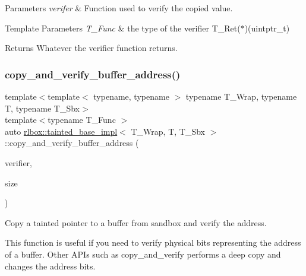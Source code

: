 \begin{DoxyParams}{Parameters}
{\em verifer} & Function used to verify the copied value. \\
\hline
\end{DoxyParams}

\begin{DoxyTemplParams}{Template Parameters}
{\em T\+\_\+\+Func} & the type of the verifier {\ttfamily T\+\_\+\+Ret($\ast$)(uintptr\+\_\+t)} \\
\hline
\end{DoxyTemplParams}
\begin{DoxyReturn}{Returns}
Whatever the verifier function returns. 
\end{DoxyReturn}
\mbox{\label{classrlbox_1_1tainted__base__impl_a4f739a0994af23036cce2d06b10953ee}} 
\subsubsection{\texorpdfstring{copy\+\_\+and\+\_\+verify\+\_\+buffer\+\_\+address()}{copy\_and\_verify\_buffer\_address()}}
{\footnotesize\ttfamily template$<$template$<$ typename, typename $>$ typename T\+\_\+\+Wrap, typename T, typename T\+\_\+\+Sbx$>$ \\
template$<$typename T\+\_\+\+Func $>$ \\
auto \hyperlink{classrlbox_1_1tainted__base__impl}{rlbox\+::tainted\+\_\+base\+\_\+impl}$<$ T\+\_\+\+Wrap, T, T\+\_\+\+Sbx $>$\+::copy\+\_\+and\+\_\+verify\+\_\+buffer\+\_\+address (\begin{DoxyParamCaption}\item[{T\+\_\+\+Func}]{verifier,  }\item[{std\+::size\+\_\+t}]{size }\end{DoxyParamCaption})\hspace{0.3cm}{\ttfamily [inline]}}



Copy a tainted pointer to a buffer from sandbox and verify the address. 

This function is useful if you need to verify physical bits representing the address of a buffer. Other A\+P\+Is such as copy\+\_\+and\+\_\+verify performs a deep copy and changes the address bits.


